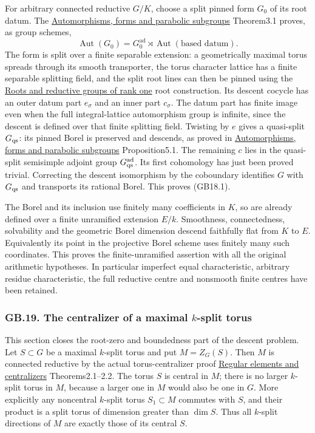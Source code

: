 \documentclass[
  11pt,
]{article}
\begin{document}
For arbitrary connected reductive \(G/K\), choose a split pinned form
\(G_0\) of its root datum. The
\href{../AG-RG/AG-RG-06.html}{Automorphisms, forms and parabolic
subgroups} Theorem3.1 proves, as group schemes, \[
 \operatorname{Aut}(G_0)=
 G_0^{\mathrm{ad}}\rtimes\operatorname{Aut}(\text{based datum}).
\] The form is split over a finite separable extension: a geometrically
maximal torus spreads through its smooth transporter, the torus
character lattice has a finite separable splitting field, and the split
root lines can then be pinned using the
\href{../AG-RG/AG-RG-03.html}{Roots and reductive groups of rank one}
root construction. Its descent cocycle has an outer datum part
\(e_\sigma\) and an inner part \(c_\sigma\). The datum part has finite
image even when the full integral-lattice automorphism group is
infinite, since the descent is defined over that finite splitting field.
Twisting by \(e\) gives a quasi-split \(G_{\rm qs}\): its pinned Borel
is preserved and descends, as proved in
\href{../AG-RG/AG-RG-06.html}{Automorphisms, forms and parabolic
subgroups} Proposition5.1. The remaining \(c\) lies in the quasi-split
semisimple adjoint group \(G_{\rm qs}^{\rm ad}\). Its first cohomology
has just been proved trivial. Correcting the descent isomorphism by the
coboundary identifies \(G\) with \(G_{\rm qs}\) and transports its
rational Borel. This proves (GB18.1).

The Borel and its inclusion use finitely many coefficients in \(K\), so
are already defined over a finite unramified extension \(E/k\).
Smoothness, connectedness, solvability and the geometric Borel dimension
descend faithfully flat from \(K\) to \(E\). Equivalently its point in
the projective Borel scheme uses finitely many such coordinates. This
proves the finite-unramified assertion with all the original arithmetic
hypotheses. In particular imperfect equal characteristic, arbitrary
residue characteristic, the full reductive centre and nonsmooth finite
centres have been retained.

\subsubsection{\texorpdfstring{GB.19. The centralizer of a maximal
\(k\)-split
torus}{GB.19. The centralizer of a maximal k-split torus}}\label{gb.19.-the-centralizer-of-a-maximal-k-split-torus}

This section closes the root-zero and boundedness part of the descent
problem. Let \(S\subset G\) be a maximal \(k\)-split torus and put
\(M=Z_G(S)\). Then \(M\) is connected reductive by the actual
torus-centralizer proof \href{../AG-RG/AG-RG-02.html}{Regular elements
and centralizers} Theorems2.1--2.2. The torus \(S\) is central in \(M\);
there is no larger \(k\)-split torus in \(M\), because a larger one in
\(M\) would also be one in \(G\). More explicitly any noncentral
\(k\)-split torus \(S_1\subset M\) commutes with \(S\), and their
product is a split torus of dimension greater than \(\dim S\). Thus all
\(k\)-split directions of \(M\) are exactly those of its central \(S\).
\end{document}
